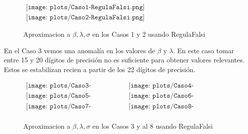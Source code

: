 \begin{figure}
$\begin{array}{c}
\texttt{[image: plots/Caso1-RegulaFalsi.png]} \\
\texttt{[image: plots/Caso2-RegulaFalsi.png]}
\end{array}$

\caption{Aproximacion a $\beta, \lambda, \sigma$ en los Casos 1 y 2 usando RegulaFalsi}
\end{figure}

En el Caso 3 vemos una anomal\'ia en los valores de $\beta$ y $\lambda$. En este caso tomar entre 15 y 20 d\'igitos de precisi\'on
no es suficiente para obtener valores relevantes. Estos se estabilizan recien a partir de los 22 d\'igitos de precisi\'on.




\begin{figure}
$\begin{array}{cc}
\texttt{[image: plots/Caso3-RegulaFalsi.png]} &
\texttt{[image: plots/Caso4-RegulaFalsi.png]} \\
\texttt{[image: plots/Caso5-RegulaFalsi.png]} &
\texttt{[image: plots/Caso6-RegulaFalsi.png]} \\
\texttt{[image: plots/Caso7-RegulaFalsi.png]} &
\texttt{[image: plots/Caso8-RegulaFalsi.png]} \\

\end{array}$

\caption{Aproximacion a $\beta, \lambda, \sigma$ en los Casos 3 y al 8 usando RegulaFalsi}
\label{fig:AproxCasosRegulaFalsi}



\end{figure}



